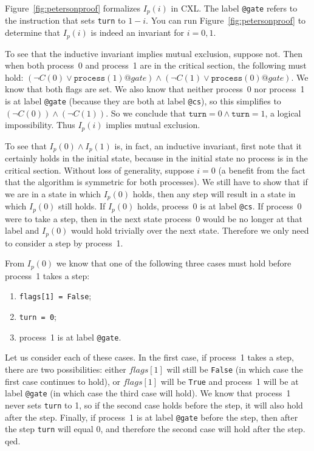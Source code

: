 \documentclass{report}
\begin{document}
Figure~\ref{fig:petersonproof} formalizes $I_p(i)$ in CXL.
The label \texttt{@gate} refers to the instruction that sets \texttt{turn} to $1-i$.
You can run Figure~\ref{fig:petersonproof} to determine
that $I_p(i)$ is indeed an invariant for $i = 0, 1$.

To see that the inductive invariant implies mutual exclusion, suppose not.  Then
when both process~0 and process~1 are in the critical section, the
following must hold:
$(\lnot C(0) \lor \mathtt{process}(1)@gate) \land
 (\lnot C(1) \lor \mathtt{process}(0)@gate)$.
We know that both flags are set.
We also know that neither process~0 nor process~1 is at label \texttt{@gate}
(because they are both at label \texttt{@cs}),
so this simplifies to $(\lnot C(0)) \land (\lnot C(1))$.
So we conclude that $\mathtt{turn} = 0 \land \mathtt{turn} = 1$, a
logical impossibility.  Thus $I_p(i)$ implies mutual exclusion.

To see that $I_p(0) \land I_p(1)$ is, in fact, an inductive invariant, first note that
it certainly holds in the initial state, because in the initial state no process
is in the critical section.
Without loss of generality, suppose $i=0$ (a benefit from the fact that the algorithm is
symmetric for both processes).  We still have to show that if we are in a state
in which $I_p(0)$ holds, then any step will result in a state in which
$I_p(0)$ still holds.
If $I_p(0)$ holds, process~0 is at label \texttt{@cs}.  If process~0
were to take a step, then in the next state process~0 would be no longer
at that label and $I_p(0)$ would hold trivially over the next state.
Therefore we only need to consider a step by process~1.

From $I_p(0)$ we know that one of the following three cases must hold before
process~1 takes a step:
\begin{enumerate}
\item \texttt{flags[1] = False};
\item \texttt{turn = 0};
\item process~1 is at label \texttt{@gate}.
\end{enumerate}

Let us consider each of these cases.
In the first case, if process~1 takes a step, there are two possibilities:
either $flags[1]$ will still be \texttt{False} (in which case the first case
continues to hold), or $flags[1]$ will be \texttt{True}
and process~1 will be at label \texttt{@gate} (in which case the third case
will hold).
We know that process~1 never sets \texttt{turn} to 1, so
if the second case holds before the step, it will also hold after the step.
Finally, if process~1 is at label \texttt{@gate} before the step, then after
the step \texttt{turn} will equal 0, and therefore the second case will hold
after the step.  qed.
\end{document}
